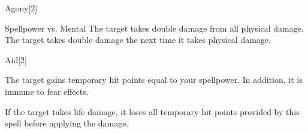 \begin{spellsection}{Agony}[2]
    \begin{spellheader}
    \end{spellheader}
    \begin{spellcontent}
        \begin{spelltargetinginfo}
        \end{spelltargetinginfo}
        \begin{spelleffects}
            \begin{spellattack}{Spellpower vs. Mental}
                \spellsuccess The target takes double damage from all physical damage.
                \spellfailure The target takes double damage the next time it takes physical damage.
            \end{spellattack}
            \spelldur \durshort
        \end{spelleffects}
    \end{spellcontent}
    \begin{spellfooter}
        \miscastrandom
    \end{spellfooter}
\end{spellsection}

\begin{spellsection}{Aid}[2]
    \begin{spellheader}
    \end{spellheader}
    \begin{spellcontent}
        \begin{spelltargetinginfo}
        \end{spelltargetinginfo}
        \begin{spelleffects}
            \spelleffect The target gains temporary hit points equal to your spellpower. In addition, it is immune to fear effects.
            \spelldur \durpersonallong
        \end{spelleffects}
    \end{spellcontent}
    \begin{spellfooter}
        \spellnotes If the target takes life damage, it loses all temporary hit points provided by this spell before applying the damage.
        \miscastexplode
    \end{spellfooter}
\end{spellsection}

